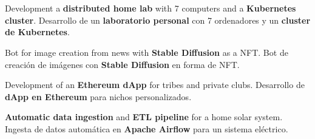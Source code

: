 \documentclass[]{cv}
\begin{document}
\begin{minipage}[t][0pt]{\linewidth}
\begin{minipage}[t]{0.57\textwidth}
\end{minipage}
\hfill
\begin{minipage}[t]{0.35\textwidth}


\section{}
\vspace{10pt}
\locationright{}
\begin{tightemize}
\item \dumblang
  {Development a \textbf{distributed home lab} with 7 computers and a \textbf{Kubernetes cluster}.}
  {Desarrollo de un \textbf{laboratorio personal} con 7 ordenadores y un \textbf{cluster de Kubernetes}.}
\item \dumblang
  {Bot for image creation from news with \textbf{Stable Diffusion} as a NFT.}
  {Bot de creación de imágenes con \textbf{Stable Diffusion} en forma de NFT.}
\item \dumblang
  {Development of an \textbf{Ethereum dApp} for tribes and private clubs.}
  {Desarrollo de \textbf{dApp en Ethereum} para nichos personalizados.}
\item \dumblang
  {\textbf{Automatic data ingestion} and \textbf{ETL pipeline} for a home solar system.}
  {Ingesta de datos automática en \textbf{Apache Airflow} para un sistema eléctrico.}
\end{tightemize}



\section{}

\sectionsep

\sectionsep

\sectionsep



\end{minipage}
\end{minipage}
\end{document}
